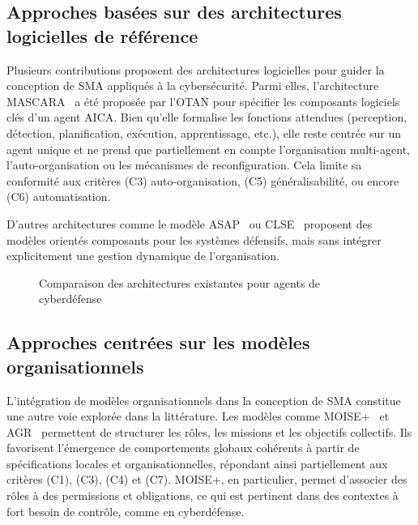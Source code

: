 \documentclass[ twoside,openright,titlepage,numbers=noenddot,headinclude,%
                footinclude=true,cleardoublepage=empty,abstractoff, %
                BCOR=5mm,paper=a4,fontsize=11pt,%
                french,american,%
                ]{scrreprt}
\begin{document}
\subsection*{Approches basées sur des architectures logicielles de référence}

Plusieurs contributions proposent des architectures logicielles pour guider la conception de SMA appliqués à la cybersécurité. Parmi elles, l'architecture MASCARA~\cite{mascara2020} a été proposée par l'OTAN pour spécifier les composants logiciels clés d'un agent AICA. Bien qu'elle formalise les fonctions attendues (perception, détection, planification, exécution, apprentissage, etc.), elle reste centrée sur un agent unique et ne prend que partiellement en compte l'organisation multi-agent, l'auto-organisation ou les mécanismes de reconfiguration. Cela limite sa conformité aux critères (C3) auto-organisation, (C5) généralisabilité, ou encore (C6) automatisation.

D'autres architectures comme le modèle ASAP~\cite{asap2017} ou CLSE~\cite{clse2016} proposent des modèles orientés composants pour les systèmes défensifs, mais sans intégrer explicitement une gestion dynamique de l'organisation.

\begin{figure}[h]
    \centering
    \caption{Comparaison des architectures existantes pour agents de cyberdéfense}
    \label{fig:architectures-aica}
\end{figure}

\subsection*{Approches centrées sur les modèles organisationnels}

L'intégration de modèles organisationnels dans la conception de SMA constitue une autre voie explorée dans la littérature. Les modèles comme MOISE+~\cite{hubner2002moise} et AGR~\cite{ferber2003agr} permettent de structurer les rôles, les missions et les objectifs collectifs. Ils favorisent l'émergence de comportements globaux cohérents à partir de spécifications locales et organisationnelles, répondant ainsi partiellement aux critères (C1), (C3), (C4) et (C7). MOISE+, en particulier, permet d'associer des rôles à des permissions et obligations, ce qui est pertinent dans des contextes à fort besoin de contrôle, comme en cyberdéfense.
\end{document}
